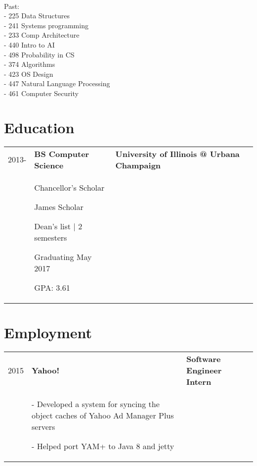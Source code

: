\documentclass[letterpaper,10pt]{article}
\begin{document}
\begin{minipage}[t][0em][t]{0.2\textwidth}
\begin{flushleft}
{      ~\\
Past: \\
- 225 Data Structures\\ 
- 241 Systems programming\\ 
- 233 Comp Architecture\\
- 440 Intro to AI\\
- 498 Probability in CS\\
- 374 Algorithms\\
- 423 OS Design\\
- 447 Natural Language Processing\\
- 461 Computer Security

    }\end{flushleft}
\end{minipage}\hspace{0.5cm}
\begin{minipage}[t][0em][t]{0.8\textwidth}
  \section*{\huge Education}
\begin{tabular}{p{} p{} p{}}
  
  {2013-} & \textbf{BS Computer Science} & \textbf{\small University of Illinois @ Urbana Champaign}\\
  & {Chancellor's Scholar

James Scholar

Dean's list | 2 semesters

Graduating May 2017

GPA: 3.61
} & \\
\end{tabular}
  



\section*{\huge Employment}

\begin{tabular}{p{} p{} p{}}
  
  {2015} & \textbf{Yahoo!} & \textbf{\small Software Engineer Intern}\\
  & {- Developed a system for syncing the object caches of Yahoo Ad Manager Plus servers

- Helped port YAM+ to Java 8 and jetty} & \\
\end{tabular}


\end{minipage}
\end{document}
